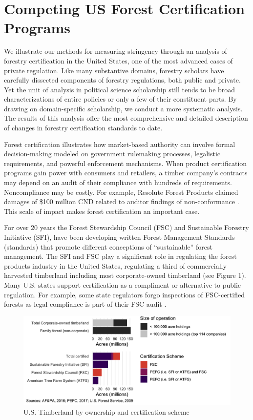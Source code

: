 \documentclass[
      12pt,
            Review ]{article}
\begin{document}
\section{Competing US Forest Certification
Programs}\label{competing-us-forest-certification-programs}

We illustrate our methods for measuring stringency through an analysis
of forestry certification in the United States, one of the most advanced
cases of private regulation. Like many substantive domains, forestry
scholars have carefully dissected components of forestry regulations,
both public and private. Yet the unit of analysis in political science
scholarship still tends to be broad characterizations of entire policies
or only a few of their constituent parts. By drawing on domain-specific
scholarship, we conduct a more systematic analysis. The results of this
analysis offer the most comprehensive and detailed description of
changes in forestry certification standards to date.

Forest certification illustrates how market-based authority can involve
formal decision-making modeled on government rulemaking processes,
legalistic requirements, and powerful enforcement mechanisms. When
product certification programs gain power with consumers and retailers,
a timber company's contracts may depend on an audit of their compliance
with hundreds of requirements. Noncompliance may be costly. For example,
Resolute Forest Products claimed damages of \$100 million CND related to
auditor findings of non-conformance \citep{Tigar2017}. This scale of
impact makes forest certification an important case.

For over 20 years the Forest Stewardship Council (FSC) and Sustainable
Forestry Initiative (SFI), have been developing written Forest
Management Standards (standards) that promote different conceptions of
``sustainable'' forest management. The SFI and FSC play a significant
role in regulating the forest products industry in the United States,
regulating a third of commercially harvested timberland including most
corporate-owned timberland (see Figure 1). Many U.S. states support
certification as a compliment or alternative to public regulation. For
example, some state regulators forgo inspections of FSC-certified
forests as legal compliance is part of their FSC audit
\citep{Judge-Lord2013}.

\begin{figure}
\centering
\includegraphics{acres-1.png}
\caption{U.S. Timberland by ownership and certification scheme}
\end{figure}
\end{document}
